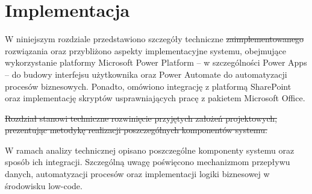 \chapter{Implementacja}

W niniejszym rozdziale przedstawiono szczegóły techniczne \st{zaimplementowanego}  rozwiązania oraz przybliżono aspekty implementacyjne systemu, obejmujące wykorzystanie platformy Microsoft Power Platform -- w szczególności Power Apps -- do budowy interfejsu użytkownika oraz Power Automate do automatyzacji procesów biznesowych.
Ponadto, omówiono integrację z platformą SharePoint oraz implementację skryptów usprawniających pracę z pakietem Microsoft Office.

\st{Rozdział stanowi techniczne rozwinięcie przyjętych założeń projektowych, prezentując metodykę realizacji poszczególnych komponentów systemu.} 

W ramach analizy technicznej  opisano poszczególne komponenty systemu oraz sposób
ich integracji. Szczególną uwagę poświęcono mechanizmom przepływu danych, automatyzacji procesów oraz implementacji logiki biznesowej w środowisku low-code.






\begin{comment}
W niniejszym rozdziale przedstawiono szczegóły techniczne zaimplementowanego rozwiązania. Omówione zostaną kluczowe aspekty
implementacyjne systemu, obejmujące wykorzystanie platformy Microsoft Power Platform - w szczególności
Power Apps do budowy interfejsu użytkownika oraz Power Automate do automatyzacji procesów biznesowych.
Ponadto, przedstawiona zostanie integracja z platformą SharePoint oraz implementacja skryptów
usprawniających pracę z pakietem Microsoft Office. Rozdział stanowi techniczne rozwinięcie przyjętych
założeń projektowych, prezentując metodykę realizacji poszczególnych komponentów systemu.

W ramach analizy technicznej zostaną szczegółowo omówione poszczególne komponenty systemu oraz sposób
ich integracji. Szczególna uwaga zostanie poświęcona mechanizmom przepływu danych, automatyzacji
procesów oraz implementacji logiki biznesowej w środowisku low-code.

 \end{comment}